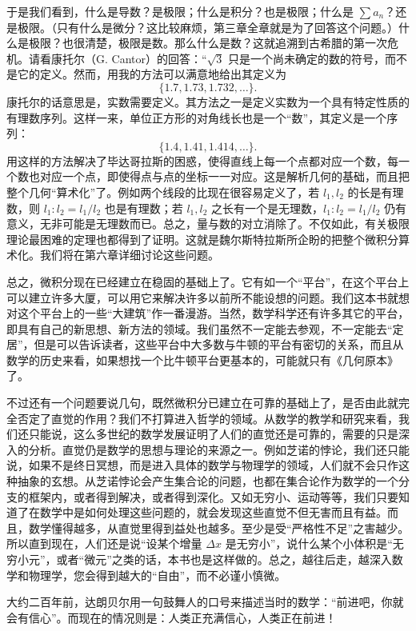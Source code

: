 于是我们看到，什么是导数？是极限；什么是积分？也是极限；什么是 $\sum a_n$？还是极限。（只有什么是微分？这比较麻烦，第三章全章就是为了回答这个问题。）什么是极限？也很清楚，极限是数。那么什么是数？这就追溯到古希腊的第一次危机。请看康托尔（G. Cantor）的回答：“$\sqrt3$ 只是一个尚未确定的数的符号，而不是它的定义。然而，用我的方法可以满意地给出其定义为
\[
\{1.7,1.73,1.732,\ldots\}.
\]
康托尔的话意思是，实数需要定义。其方法之一是定义实数为一个具有特定性质的有理数序列。这样一来，单位正方形的对角线长也是一个“数”，其定义是一个序列：
\[
\{1.4,1.41,1.414,\ldots\}.
\]
用这样的方法解决了毕达哥拉斯的困惑，使得直线上每一个点都对应一个数，每一个数也对应一个点，即使得点与点的坐标一一对应。这是解析几何的基础，而且把整个几何“算术化”了。例如两个线段的比现在很容易定义了，若 $l_1,l_2$ 的长是有理数，则 $l_1:l_2=l_1/l_2$ 也是有理数；若 $l_1,l_2$ 之长有一个是无理数，$l_1:l_2=l_1/l_2$ 仍有意义，无非可能是无理数而已。总之，量与数的对立消除了。不仅如此，有关极限理论最困难的定理也都得到了证明。这就是魏尔斯特拉斯所企盼的把整个微积分算术化。我们将在第六章详细讨论这些问题。

总之，微积分现在已经建立在稳固的基础上了。它有如一个“平台”，在这个平台上可以建立许多大厦，可以用它来解决许多以前所不能设想的问题。我们这本书就想对这个平台上的一些“大建筑”作一番漫游。当然，数学科学还有许多其它的平台，即具有自己的新思想、新方法的领域。我们虽然不一定能去参观，不一定能去“定居”，但是可以告诉读者，这些平台中大多数与牛顿的平台有密切的关系，而且从数学的历史来看，如果想找一个比牛顿平台更基本的，可能就只有《几何原本》了。

不过还有一个问题要说几句，既然微积分已建立在可靠的基础上了，是否由此就完全否定了直觉的作用？我们不打算进入哲学的领域。从数学的教学和研究来看，我们还只能说，这么多世纪的数学发展证明了人们的直觉还是可靠的，需要的只是深入的分析。直觉仍是数学的思想与理论的来源之一。例如芝诺的悖论，我们还只能说，如果不是终日冥想，而是进入具体的数学与物理学的领域，人们就不会只作这种抽象的玄想。从芝诺悖论会产生集合论的问题，也都在集合论作为数学的一个分支的框架内，或者得到解决，或者得到深化。又如无穷小、运动等等，我们只要知道了在数学中是如何处理这些问题的，就会发现这些直觉不但无害而且有益。而且，数学懂得越多，从直觉里得到益处也越多。至少是受“严格性不足”之害越少。所以直到现在，人们还是说“设某个增量 $\Delta x$ 是无穷小”，说什么某个小体积是“无穷小元”，或者“微元”之类的话，本书也是这样做的。总之，越往后走，越深入数学和物理学，您会得到越大的“自由”，而不必谨小慎微。

大约二百年前，达朗贝尔用一句鼓舞人的口号来描述当时的数学：“前进吧，你就会有信心”。而现在的情况则是：人类正充满信心，人类正在前进！
